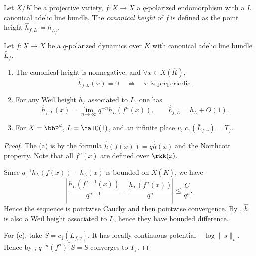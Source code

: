 \begin{definition}[label=\labelNFM{def:canonical-height}, status=draft, tag=0000000]
	Let $X/K$ be a projective variety, $f: X \to X$ a $q$-polarized endomorphism with a $\bar L$ canonical adelic line bundle.
	The \emph{canonical height} of $f$ is defined as the point height $\widehat h_{f,L} \coloneqq h_{\bar L_f}$.
\end{definition}

\begin{proposition}[label=\labelNFM{prop:canonical-height-properties}, status=draft, tag=0000000]
	Let $f:X \to X$ be a $q$-polarized dynamics over $K$ with canonical adelic line bundle $\bar L_f$.
	\begin{enumerate}
		\item The canonical height is nonnegative, and $\forall x \in X(\overline{K})$,
		      \[ \widehat h_{f,L}(x) = 0 \quad\Longleftrightarrow\quad x\text{ is preperiodic}. \]
		\item For any Weil height $h_L$ associated to $L$, one has
		      \[ \widehat h_{f,L}(x) = \lim_{n \to \infty}q^{-n}h_L(f^n(x)), \qquad \widehat h_{f,L} = h_L+O(1). \]
		\item For $X = \bbP^d$, $L = \calO(1)$, and an infinite place $v$, $c_1(\bar L_{f,v}) = T_f$.
	\end{enumerate}
\end{proposition}
\begin{proof}
	The (a) is by the formula $\widehat h(f(x)) = q \widehat h(x)$ and the Northcott property.
	Note that all $f^n(x)$ are defined over $\rkk(x)$.

	Since $q^{-1}h_L(f(x)) - h_L(x)$ is bounded on $X(\overline{K})$, we have
	\[ \left| \frac{h_L(f^{n+1}(x))}{q^{n+1}} - \frac{h_L(f^{n}(x))}{q^{n}} \right| \leq \frac{C}{q^n}. \]
	Hence the sequence is pointwise Cauchy and then pointwise convergence.
	By \Yang{}, $\widehat h$ is also a Weil height associated to $L$, hence they have bounded difference.

	For (c), take $S = c_1(\bar L_{f,v})$.
	It has locally continuous potential $-\log \|s\|_v$.
	Hence by \Yang{}, $q^{-n}(f^n)^*S = S$ converges to $T_f$.
\end{proof}




